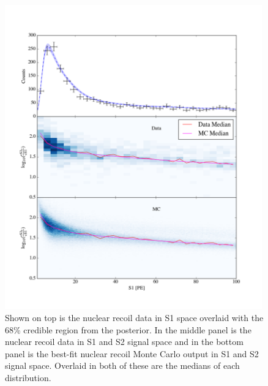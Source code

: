 \begin{figure}[p]
	\centering
	\includegraphics[width=0.99\textwidth]{xe1t_nr_results_s1_2d}
	\caption{Shown on top is the nuclear recoil data in S1 space overlaid with the 68\% credible region from the posterior.  In the middle panel is the nuclear recoil data in S1 and S2 signal space and in the bottom panel is the best-fit nuclear recoil Monte Carlo output in S1 and S2 signal space.  Overlaid in both of these are the medians of each distribution.}
	\label{fig:xe1t_nr_cal_s1_2d}
\end{figure}


